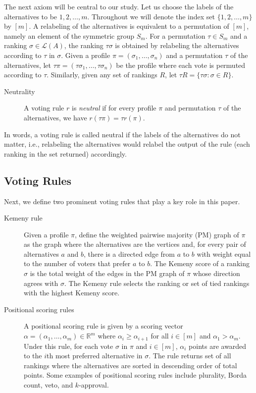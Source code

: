\documentclass[prodmode]{acmsmall-ec14}
\newcommand{\calL}{{\mathcal{L}}}
\newcommand{\rank}{{\calL(A)}}
\begin{document}
The next axiom will be central to our study. Let us choose the labels of the alternatives to be $1,2,\ldots,m$. Throughout we will denote the index set $\{1,2,\ldots,m\}$ by $[m]$. A relabeling of the alternatives is equivalent to a permutation of $[m]$, namely an element of the symmetric group $S_m$. For a permutation $\tau \in S_m$ and a ranking $\sigma \in \rank$, the ranking $\tau\sigma$ is obtained by relabeling the alternatives according to $\tau$ in $\sigma$. Given a profile $\pi = (\sigma_1,\ldots,\sigma_n)$ and a permutation $\tau$ of the alternatives, let $\tau \pi = (\tau \sigma_1,\ldots,\tau \sigma_n)$ be the profile where each vote is permuted according to $\tau$. Similarly, given any set of rankings $R$, let $\tau R = \{\tau \sigma : \sigma \in R\}$.
%
\begin{description}
\item[Neutrality] A voting rule $r$ is \emph{neutral} if for every profile $\pi$ and permutation $\tau$ of the alternatives, we have $r(\tau \pi) = \tau r(\pi)$.
\end{description}
%
In words, a voting rule is called neutral if the labels of the alternatives do not matter, i.e., relabeling the alternatives would relabel the output of the rule (each ranking in the set returned) accordingly.  

\subsection*{Voting Rules} Next, we define two prominent voting rules that play a key role in this paper.

\begin{description}
\item[Kemeny rule] Given a profile $\pi$, define the weighted pairwise majority (PM) graph of $\pi$ as the graph where the alternatives are the vertices and, for every pair of alternatives $a$ and $b$, there is a directed edge from $a$ to $b$ with weight equal to the number of voters that prefer $a$ to $b$. The Kemeny score of a ranking $\sigma$ is the total weight of the edges in the PM graph of $\pi$ whose direction agrees with $\sigma$. The Kemeny rule selects the ranking or set of tied rankings with the highest Kemeny score.\\

\item[Positional scoring rules] A positional scoring rule is given by a scoring vector $\alpha = (\alpha_1,\ldots,\alpha_m) \in \mathbb{R}^m$ where $\alpha_i \ge \alpha_{i+1}$ for all $i \in [m]$ and $\alpha_1 > \alpha_m$. Under this rule, for each vote $\sigma$ in $\pi$ and $i \in [m]$, $\alpha_i$ points are awarded to the $i${th} most preferred alternative in $\sigma$. The rule returns set of all rankings where the alternatives are sorted in descending order of total points. Some examples of positional scoring rules include plurality, Borda count, veto, and $k$-approval.
\end{description}
\end{document}
